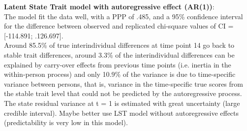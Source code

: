 \textbf{Latent State Trait model with autoregressive effect (AR(1))}: \\
The model fit the data well, with a PPP of .485, and a 95\% confidence interval for the difference between observed and replicated chi-square values of CI =   [-114.891; .126.697]. \\
Around 85.5\% of true interindividual differences at time point 14 go back to stable trait differences, around 3.3\% of the interindividual differences can be explained by carry-over effects from previous time points (i.e. inertia in the within-person process) and only 10.9\% of the variance is due to time-specific variance between persons, that is, variance in the time-specific true scores from the stable trait level that could not be predicted by the autoregressive process. \\
The state residual variance at t = 1 is estimated with great uncertainty (large credible interval). Maybe better use LST model without autoregressive effects (predictability is very low in this model).

